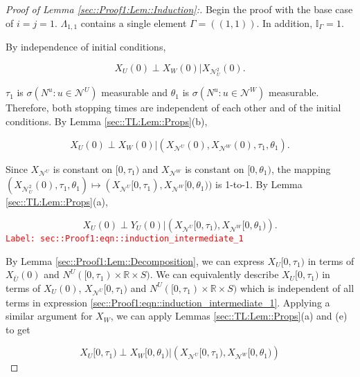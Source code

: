 \documentclass[12pt]{article}
\newcommand{\mb}{\mathbb}
\newcommand{\mc}{\mathcal}
\newcommand{\ov}{\overline}
\newcommand{\tr}{\textcolor{red}}
\newcommand{\labe}[1]{\tr{\texttt{Label: #1}}}
\newcommand{\vv}{u}								%
\renewcommand{\U}{U}							%
\newcommand{\UU}{W}								%
\renewcommand{\S}{S}							%
\newcommand{\X}{X}								%
\newcommand{\neigh}{\mc{N}}						%
\newcommand{\dneigh}{\mc{N}^2}					%
\newcommand{\vind}[1]{^{#1}}					%
\newcommand{\cind}[1]{_{#1}}					%
\newcommand{\cl}{\ov}							%
\newcommand{\tp}[1]{(#1)}						%
\newcommand{\tip}[1]{#1}						%
\newcommand{\poiss}{N}							%
\newcommand{\indx}[1]{_{#1}}					%
\newcommand{\dnvind}[1]{_{#1}}					%
\newcommand{\XX}{Y}								%
\newcommand{\rt}{\tau}							%
\newcommand{\rtt}{\theta}						%
\newcommand{\apath}{\Gamma}						%
\newcommand{\pathset}[2]{\Lambda_{#1,#2}}		%
\begin{document}
\begin{proof}[Proof of Lemma \ref{sec::Proof1:Lem::Induction}:]
Begin the proof with the base case of \(i=j =1\). \(\pathset{1}{1}\) contains a single element \(\apath = ((1,1))\). In addition, \(\mb{I}_{\apath} = 1\).

By independence of initial conditions,

\[\X\cind{\U}\tp{0}\perp \X\cind{\UU}\tp{0}|\X\cind{\dneigh\dnvind{\U}}\tp{0}.\]

\(\rt\indx{1}\) is \(\sigma\left(\poiss\vind{\vv}:\vv\in \neigh\vind{\U}\right)\) measurable and \(\rtt\indx{1}\) is \(\sigma\left(\poiss\vind{\vv}:\vv\in \neigh\vind{\UU}\right)\) measurable. Therefore, both stopping times are independent of each other and of the initial conditions. By Lemma \ref{sec::TL:Lem::Props}(b), 

\[\X\cind{\U}\tp{0}\perp \X\cind{\UU}\tp{0}|\left(\X\cind{\neigh\vind{\U}}\tp{0},\X\cind{\neigh\vind{\UU}}\tp{0},\rt\indx{1},\rtt\indx{1}\right).\]

Since \(\X\cind{\neigh\vind{\U}}\) is constant on \([0,\rt\indx{1})\) and \(\X\cind{\neigh\vind{\UU}}\) is constant on \([0,\rtt\indx{1})\), the mapping \((\X\cind{\dneigh\dnvind{\U}}\tp{0},\rt\indx{1},\rtt\indx{1}) \mapsto (\X\cind{\neigh\vind{\U}}\tip{[0,\rt\indx{1})},\X\cind{\neigh\vind{\UU}}\tip{[0,\rtt\indx{1})})\) is 1-to-1. By Lemma \ref{sec::TL:Lem::Props}(a),

\begin{equation}
\X\cind{\U}\tp{0}\perp \XX\cind{\U}\tp{0}|\left(\X\cind{\neigh\vind{\U}}\tip{[0,\rt\indx{1})},\X\cind{\neigh\vind{\UU}}\tip{[0,\rtt\indx{1})}\right).
\label{sec::Proof1:eqn::induction_intermediate_1}
\end{equation}
\labe{sec::Proof1:eqn::induction\_intermediate\_1}

By Lemma \ref{sec::Proof1:Lem::Decomposition}, we can express \(\X\cind{\U}\tip{[0,\rt\indx{1})}\) in terms of \(\X\cind{\cl{\U}}\tp{0}\) and \(\poiss\vind{\U}([0,\rt\indx{1})\times\mb{R}\times\S)\). We can equivalently describe \(\X\cind{\U}\tip{[0,\rt\indx{1})}\) in terms of \(\X\cind{\U}\tp{0}\), \(\X\cind{\neigh\vind{\U}}\tip{[0,\rt\indx{1})}\) and \(\poiss\vind{\U}([0,\rt\indx{1})\times \mb{R}\times \S)\) which is independent of all terms in expression \eqref{sec::Proof1:eqn::induction_intermediate_1}. Applying a similar argument for \(\X\cind{\UU}\), we can apply Lemmas \ref{sec::TL:Lem::Props}(a) and (e) to get

\[\X\cind{\U}\tip{[0,\rt\indx{1})}\perp \X\cind{\UU}\tip{[0,\rtt\indx{1})}|\left(\X\cind{\neigh\vind{\U}}\tip{[0,\rt\indx{1})},\X\cind{\neigh\vind{\UU}}\tip{[0,\rtt\indx{1})}\right)\]


\end{proof}
\end{document}
